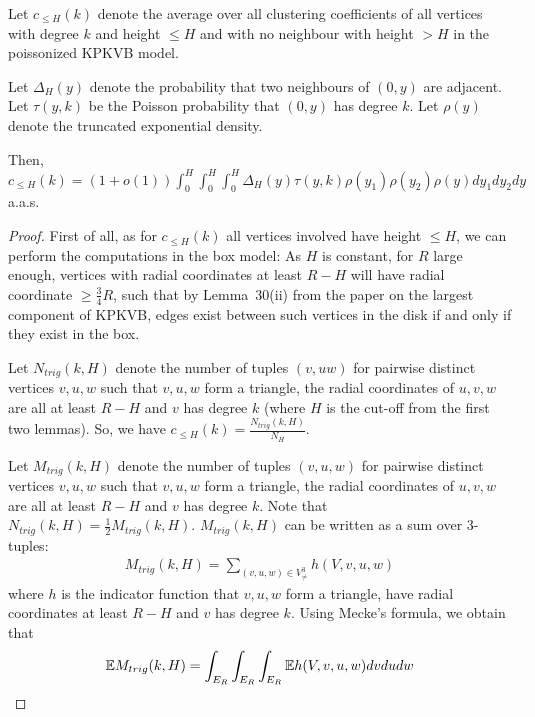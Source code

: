 \begin{lemma}
Let $c_{\leq H}(k)$ denote the average over all clustering coefficients of all vertices with degree $k$ and height $\leq H$ and with no neighbour with height $>H$ in the poissonized KPKVB model.

Let $\Delta_H(y)$ denote the probability that two neighbours of $(0,y)$ are adjacent. Let $\tau(y,k)$ be the Poisson probability that $(0,y)$ has degree $k$. Let $\rho(y)$ denote the truncated exponential density.

Then,
$c_{\leq H}(k) = (1+o(1))\int_0^H \int_0^H \int_0^H \Delta_H(y) \tau(y,k)\rho(y_1)\rho(y_2)\rho(y) dy_1dy_2 dy$ a.a.s.
\end{lemma}
\begin{proof}
First of all, as for $c_{\leq H}(k)$ all vertices involved have height $\leq H$, we can perform the computations in the box model: As $H$ is constant, for $R$ large enough, vertices with radial coordinates at least $R-H$ will have radial coordinate $\geq \frac{3}{4}R$, such that by Lemma~30(ii) from the paper on the largest component of KPKVB, edges exist between such vertices in the disk if and only if they exist in the box.

Let $N_{trig}(k,H)$ denote the number of tuples $(v,uw)$ for pairwise distinct vertices $v,u,w$ such that $v,u,w$ form a triangle, the radial coordinates of $u,v,w$ are all at least $R-H$ and $v$ has degree $k$ (where $H$ is the cut-off from the first two lemmas). So, we have $c_{\leq H}(k) = \frac{N_{trig}(k,H)}{N_H}$.

Let $M_{trig}(k,H)$ denote the number of tuples $(v,u,w)$ for pairwise distinct vertices $v,u,w$ such that $v,u,w$ form a triangle, the radial coordinates of $u,v,w$ are all at least $R-H$ and $v$ has degree $k$. Note that $N_{trig}(k,H) = \frac{1}{2}M_{trig}(k,H)$. $M_{trig}(k,H)$ can be written as a sum over $3$-tuples:
\begin{align*}
M_{trig}(k,H) = \sum_{(v,u,w) \in V_{\not =}^3} h(V,v,u,w)
\end{align*}
where $h$ is the indicator function that $v,u,w$ form a triangle, have radial coordinates at least $R-H$ and $v$ has degree $k$.
Using Mecke's formula, we obtain that 
\begin{align*}
\mathbb{E} M_{trig}(k,H) = \int_{E_R} \int_{E_R}\int_{E_R} \mathbb{E} h(V,v,u,w) dvdudw
\end{align*}




\end{proof}
